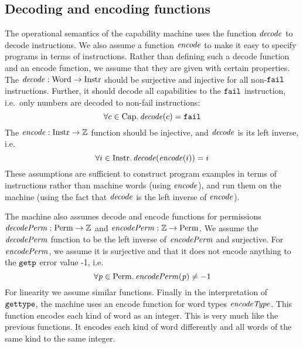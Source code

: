 \documentclass[acmsmall,screen]{acmart}\settopmatter{}
\renewcommand{\decInstr}[1]{\plainfun{decode}{#1}}
\renewcommand{\encInstr}[1]{\plainfun{encode}{#1}}
\renewcommand{\perm}{\var{p}}
\newenvironment{jversion}%
    {\color{OliveGreen}}{}
\begin{document}
\begin{jversion}
\subsection{Decoding and encoding functions}
The operational semantics of the capability machine uses the function $\decInstr{}$ to decode instructions.
We also assume a function $\encInstr{}$ to make it easy to specify programs in terms of instructions.
Rather than defining such a decode function and an encode function, we assume that they are given with certain properties.
The $\decInstr{} : \Word \fun \Instr$ should be surjective and injective for all non-$\texttt{{\color{black} fail}}$ instructions.
Further, it should decode all capabilities to the $\texttt{{\color{black} fail}}$ instruction, i.e.\ only numbers are decoded to non-fail instructions:
\[
\forall c \in \Caps \ldotp \decInstr{c} = \fail
\]
The $\encInstr{} : \Instr \fun \ints$ function should be injective, and  $\decInstr{}$ is its left inverse, i.e.
\[
\forall i \in \Instr \ldotp \decInstr{}(\encInstr{i}) = i
\]
These assumptions are sufficient to construct program examples in terms of instructions rather than machine words (using $\encInstr{}$), and run them on the machine (using the fact that $\decInstr{}$ is the left inverse of $\encInstr{}$).

The machine also assumes decode and encode functions for permissions $\decPerm{} : \Perm \fun \ints$ and $\encPerm{} : \ints \fun \Perm$.
We assume the $\decPerm{}$ function to be the left inverse of $\encPerm{}$ and surjective. For $\encPerm{}$, we assume it is surjective and that it does not encode anything to the $\tgetp{}{}$ error value -1, i.e.
\[
  \forall \perm \in \Perm \ldotp \encPerm{\perm} \neq -1
\]
For linearity we assume similar functions.
Finally in the interpretation of $\tisptr{}{}$, the machine uses an encode function for word types $\encType{}$.
This function encodes each kind of word as an integer.
This is very much like the previous functions.
It encodes each kind of word differently and all words of the same kind to the same integer.
\end{jversion}
\end{document}
